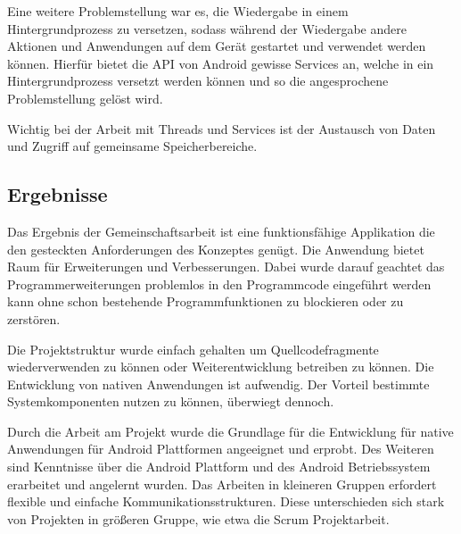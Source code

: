 Eine weitere Problemstellung war es, die Wiedergabe in einem Hintergrundprozess zu versetzen, sodass während der Wiedergabe andere Aktionen und Anwendungen auf dem Gerät gestartet und verwendet werden können. Hierfür bietet die API von Android gewisse Services an, welche in ein Hintergrundprozess versetzt werden können und so die angesprochene Problemstellung gelöst wird.

Wichtig bei der Arbeit mit Threads und Services ist der Austausch von Daten und Zugriff auf gemeinsame Speicherbereiche.

\subsection{Ergebnisse}

Das Ergebnis der Gemeinschaftsarbeit ist eine funktionsfähige Applikation die den gesteckten Anforderungen des Konzeptes genügt. Die Anwendung bietet Raum für Erweiterungen und Verbesserungen. Dabei wurde darauf geachtet das Programmerweiterungen problemlos in den Programmcode eingeführt werden kann ohne schon bestehende Programmfunktionen zu blockieren oder zu zerstören.

Die Projektstruktur wurde einfach gehalten um Quellcodefragmente wiederverwenden zu können oder Weiterentwicklung betreiben zu können. Die Entwicklung von nativen Anwendungen ist aufwendig. Der Vorteil bestimmte Systemkomponenten nutzen zu können, überwiegt dennoch.

Durch die Arbeit am Projekt wurde die Grundlage für die Entwicklung für native Anwendungen für Android Plattformen angeeignet und erprobt. Des Weiteren sind Kenntnisse über die Android Plattform und des Android Betriebssystem erarbeitet und angelernt wurden. Das Arbeiten in kleineren Gruppen erfordert flexible und einfache Kommunikationsstrukturen. Diese unterschieden sich stark von Projekten in größeren Gruppe, wie etwa die Scrum\cite{9783868998337} Projektarbeit.
